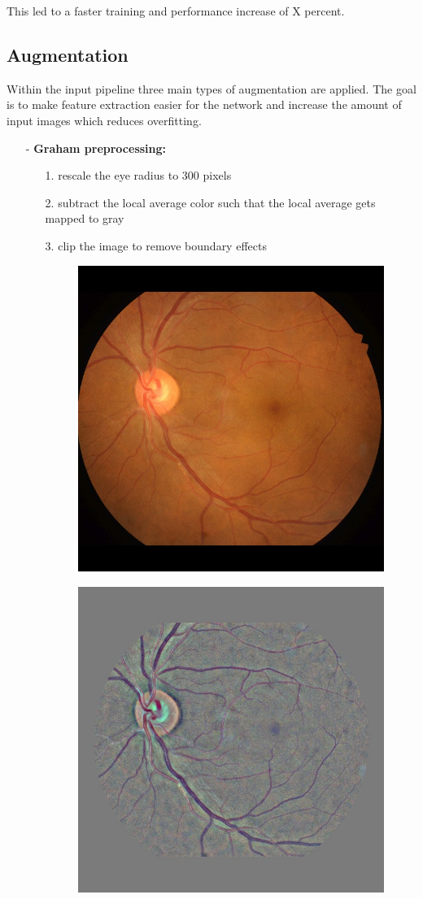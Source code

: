 \documentclass{article}
\begin{document}
This led to a faster training and performance increase of X percent.

\subsection{Augmentation}
Within the input pipeline three main types of augmentation are applied.
The goal is to make feature extraction easier for the network and increase the amount of input images which reduces overfitting.
\begin{itemize}
  \item[-] \textbf{Graham preprocessing:} \begin{itemize}
    \item[1.] rescale the eye radius to 300 pixels 
    \item[2.] subtract the local average color such that the local average gets mapped to gray
    \item[3.] clip the image to remove boundary effects
    \begin{figure}[h]
      \begin{minipage}[b]{.5\textwidth}
          \begin{center}
          \includegraphics[width=.5\linewidth]{IDRiD_060.jpg}
          \captionsetup{justification=centering}
          \label{fig:IDRiD}
          \end{center}
      \end{minipage}%
      \begin{minipage}[b]{.5\textwidth}
          \begin{center}
          \includegraphics[width=.5\linewidth]{IDRiD_060_graham.jpg}

\end{center}
\end{minipage}
\end{figure}
\end{itemize}
\end{itemize}
\end{document}

